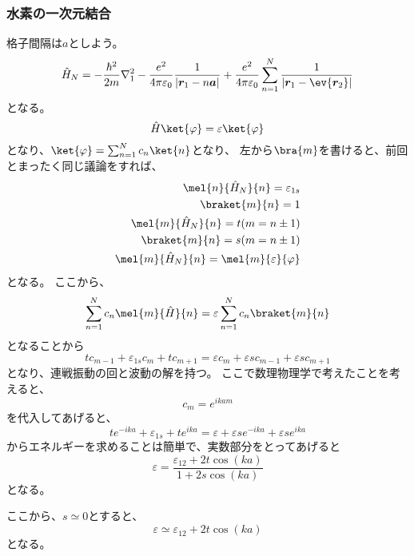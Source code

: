\documentclass[titlepage]{ltjsarticle}
\begin{document}
\subsubsection{水素の一次元結合}
格子間隔は\(a\)としよう。
\begin{equation}
  \hat{H}_N = - \frac{\hbar^2}{2m} \nabla_1^2 - \frac{e^2}{4\pi \varepsilon_0} \frac{1}{|\bm{r}_1- n\bm{a}|} + \frac{e^2}{4\pi \varepsilon_0} \sum^N_{n=1} \frac{1}{|\bm{r}_1-\ev{\bm{r}_2}|}
\end{equation}
となる。
\begin{equation}
  \hat{H}\ket{\varphi} = \varepsilon \ket{\varphi}
\end{equation}
となり、\(\ket{\varphi} = \sum_{n=1}^{N}c_n \ket{n}\)となり、
左から\(\bra{m}\)を書けると、前回とまったく同じ議論をすれば、
\begin{align}
  \mel{n}{\hat{H}_N}{n} = \varepsilon_{1s} \\
  \braket{m}{n} = 1 \\
  \mel{m}{\hat{H}_N}{n} = t (m=n \pm 1) \\
  \braket{m}{n} = s (m = n \pm 1) \\
  \mel{m}{\hat{H}_N}{n} = \mel{m}{\varepsilon}{\varphi}
\end{align}
となる。
ここから、
\begin{equation}
  \sum_{n=1}^{N}c_n \mel{m}{\hat{H}}{n} = \varepsilon \sum_{n=1}^{N}c_n \braket{m}{n}
\end{equation}
となることから
\begin{equation}
  t c_{m-1} + \varepsilon_{1s} c_m + t c_{m+1}  = \varepsilon c_m + \varepsilon s c_{m-1} + \varepsilon s c_{m+1}
\end{equation}
となり、連戦振動の回と波動の解を持つ。
ここで数理物理学で考えたことを考えると、
\begin{equation}
  c_m = e^{ikam}
\end{equation}
を代入してあげると、
\begin{equation}
  t e^{-ika} + \varepsilon_{1s} + t e^{ika} = \varepsilon + \varepsilon s e^{-ika} + \varepsilon s e^{ika}
\end{equation}
からエネルギーを求めることは簡単で、実数部分をとってあげると
\begin{equation}
  \varepsilon = \frac{\varepsilon_{12}+2t \cos (ka)}{1+2s \cos(ka)}
\end{equation}
となる。

ここから、\(s\simeq 0\)とすると、
\begin{equation}
  \varepsilon \simeq \varepsilon_{12} + 2 t \cos(ka)
\end{equation}
となる。
\end{document}
